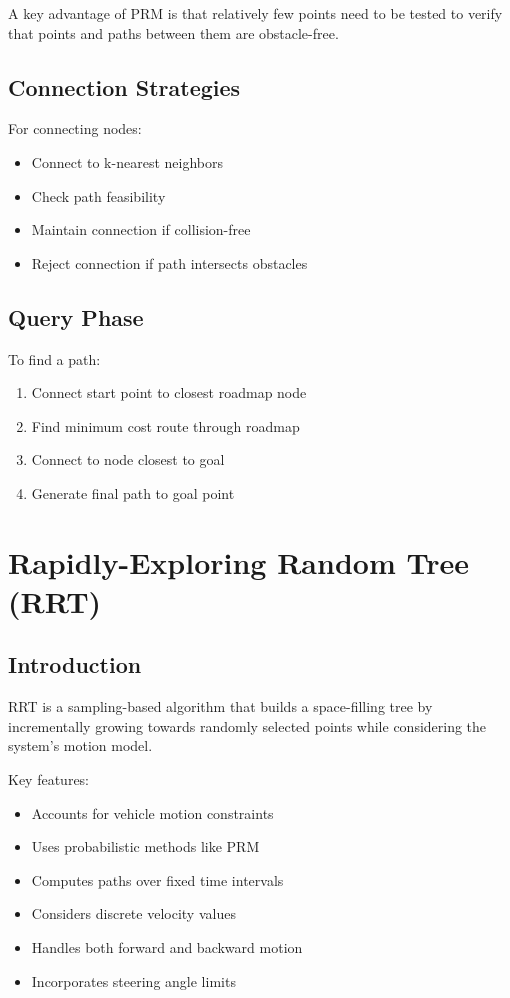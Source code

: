 \documentclass[openany]{book}
\theoremstyle{definition}
\theoremstyle{remark}
\newcommand{\definitionbox}[1]{
\begin{tcolorbox}[colback=blue!5,colframe=blue!40!black,title=Definition]
 #1
\end{tcolorbox}
}
\newcommand{\note}[1]{
\begin{tcolorbox}[colback=green!5,colframe=green!40!black,title=Note]
 #1
\end{tcolorbox}
}
\begin{document}
\note{A key advantage of PRM is that relatively few points need to be tested to verify that points and paths between them are obstacle-free.}

\subsection{Connection Strategies}
For connecting nodes:
\begin{itemize}
   \item Connect to k-nearest neighbors
   \item Check path feasibility
   \item Maintain connection if collision-free
   \item Reject connection if path intersects obstacles
\end{itemize}

\subsection{Query Phase}
To find a path:
\begin{enumerate}
   \item Connect start point to closest roadmap node
   \item Find minimum cost route through roadmap
   \item Connect to node closest to goal
   \item Generate final path to goal point
\end{enumerate}

\section{Rapidly-Exploring Random Tree (RRT)}

\subsection{Introduction}
\definitionbox{RRT is a sampling-based algorithm that builds a space-filling tree by incrementally growing towards randomly selected points while considering the system's motion model.}

Key features:
\begin{itemize}
   \item Accounts for vehicle motion constraints
   \item Uses probabilistic methods like PRM
   \item Computes paths over fixed time intervals
   \item Considers discrete velocity values
   \item Handles both forward and backward motion
   \item Incorporates steering angle limits
\end{itemize}
\end{document}
